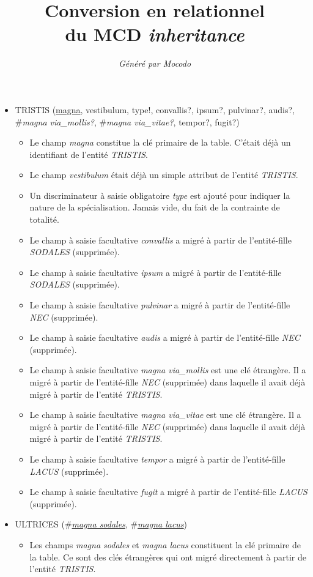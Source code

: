 \documentclass[a4paper]{article}
\title{Conversion en relationnel\\du MCD \emph{inheritance}}
\author{\emph{Généré par Mocodo}}
\newcommand{\relat}[1]{\textsc{#1}}
\newcommand{\attr}[1]{#1}
\newcommand{\prim}[1]{\uline{#1}}
\newcommand{\foreign}[1]{\#\textsl{#1}}
\begin{document}
\maketitle

\begin{itemize}
  \item \relat{TRISTIS} (\prim{magna}, \attr{vestibulum}, \attr{type!}, \attr{convallis?}, \attr{ipsum?}, \attr{pulvinar?}, \attr{audis?}, \foreign{magna via_mollis?}, \foreign{magna via_vitae?}, \attr{tempor?}, \attr{fugit?})
  \begin{itemize}
    \item Le champ \emph{magna} constitue la clé primaire de la table. C'était déjà un identifiant de l'entité \emph{TRISTIS}.
    \item Le champ \emph{vestibulum} était déjà un simple attribut de l'entité \emph{TRISTIS}.
    \item Un discriminateur à saisie obligatoire \emph{type} est ajouté pour indiquer la nature de la spécialisation. Jamais vide, du fait de la contrainte de totalité.
    \item Le champ à saisie facultative \emph{convallis} a migré à partir de l'entité-fille \emph{SODALES} (supprimée).
    \item Le champ à saisie facultative \emph{ipsum} a migré à partir de l'entité-fille \emph{SODALES} (supprimée).
    \item Le champ à saisie facultative \emph{pulvinar} a migré à partir de l'entité-fille \emph{NEC} (supprimée).
    \item Le champ à saisie facultative \emph{audis} a migré à partir de l'entité-fille \emph{NEC} (supprimée).
    \item Le champ à saisie facultative \emph{magna via_mollis} est une clé étrangère. Il a migré à partir de l'entité-fille \emph{NEC} (supprimée) dans laquelle il avait déjà migré à partir de l'entité \emph{TRISTIS}.
    \item Le champ à saisie facultative \emph{magna via_vitae} est une clé étrangère. Il a migré à partir de l'entité-fille \emph{NEC} (supprimée) dans laquelle il avait déjà migré à partir de l'entité \emph{TRISTIS}.
    \item Le champ à saisie facultative \emph{tempor} a migré à partir de l'entité-fille \emph{LACUS} (supprimée).
    \item Le champ à saisie facultative \emph{fugit} a migré à partir de l'entité-fille \emph{LACUS} (supprimée).
  \end{itemize}

  \item \relat{ULTRICES} (\foreign{\prim{magna sodales}}, \foreign{\prim{magna lacus}})
  \begin{itemize}
    \item Les champs \emph{magna sodales} et \emph{magna lacus} constituent la clé primaire de la table. Ce sont des clés étrangères qui ont migré directement à partir de l'entité \emph{TRISTIS}.
  \end{itemize}

\end{itemize}
\end{document}

